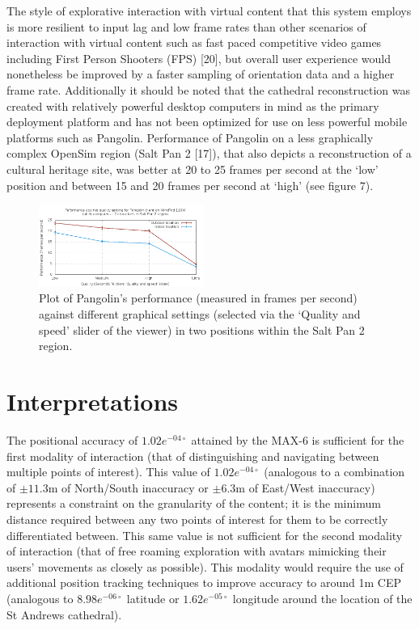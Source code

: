 The style of explorative interaction with virtual content that this system employs is more resilient to input lag and low frame rates than other scenarios of interaction with virtual content such as fast paced competitive video games including First Person Shooters (FPS) [20], but overall user experience would nonetheless be improved by a faster sampling of orientation data and a higher frame rate. Additionally it should be noted that the cathedral reconstruction was created with relatively powerful desktop computers in mind as the primary deployment platform and has not been optimized for use on less powerful mobile platforms such as Pangolin. Performance of Pangolin on a less graphically complex OpenSim region (Salt Pan 2 [17]), that also depicts a reconstruction of a cultural heritage site, was better at 20 to 25 frames per second at the `low' position and between 15 and 20 frames per second at `high' (see figure 7).

\begin{figure}[h]
\centering
\includegraphics[width=0.48\textwidth]{images/figure_7}
\caption{Plot of Pangolin's performance (measured in frames per second) against different graphical settings (selected via the `Quality and speed' slider of the viewer) in two positions within the Salt Pan 2 region.}
\label{framerate_graph}
\end{figure}

\section{Interpretations}
The positional accuracy of $1.02e^{-04\circ}$ attained by the MAX-6 is sufficient for the first modality of interaction (that of distinguishing and navigating between multiple points of interest). This value of $1.02e^{-04\circ}$ (analogous to a combination of $\pm11.3$m of North/South inaccuracy or $\pm6.3$m of East/West inaccuracy) represents a constraint on the granularity of the content; it is the minimum distance required between any two points of interest for them to be correctly differentiated between. This same value is not sufficient for the second modality of interaction (that of free roaming exploration with avatars mimicking their users' movements as closely as possible). This modality would require the use of additional position tracking techniques to improve accuracy to around 1m CEP (analogous to $8.98e^{-06\circ}$ latitude or $1.62e^{-05\circ}$ longitude around the location of the St Andrews cathedral).

